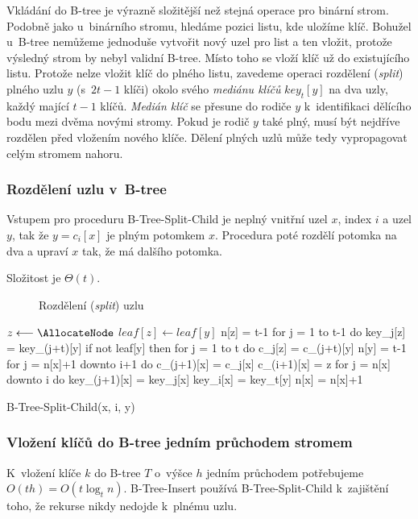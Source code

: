 Vkládání do B-tree je výrazně složitější než stejná operace pro binární
strom\@. Podobně jako u~binárního stromu, hledáme pozici listu,
kde uložíme klíč. Bohužel u~B-tree nemůžeme jednoduše vytvořit nový
uzel pro list a ten vložit, protože výsledný strom by nebyl validní
B-tree\@. Místo toho se vloží klíč už do existujícího listu\@. Protože
nelze vložit klíč do plného listu, zavedeme operaci rozdělení (\emph{split})
plného uzlu $y$ (s~$2t-1$ klíči) okolo svého \emph{mediánu klíčů}
$key_{t}[y]$ na dva uzly, každý mající $t-1$ klíčů\@. \emph{Medián
klíč} se přesune do rodiče $y$ k~identifikaci dělícího bodu mezi
dvěma novými stromy\@. Pokud je rodič $y$ také plný, musí být nejdříve
rozdělen před vložením nového klíče. Dělení plných uzlů může tedy
vypropagovat celým stromem nahoru.


\subsubsection{Rozdělení uzlu v~B-tree}

Vstupem pro proceduru B-Tree-Split-Child je neplný vnitřní uzel $x$,
index $i$ a uzel $y$, tak že $y=c_{i}[x]$ je plným potomkem $x$\@.
Procedura poté rozdělí potomka na dva a upraví $x$ tak, že má dalšího
potomka.

Složitost je $\Theta(t)$\@.

\begin{figure}[t]
\caption{Rozdělení (\emph{split}) uzlu}
\end{figure}


\begin{algorithm}[t]
\SetAlgoLined
{}
{$z \longleftarrow \AllocateNode$}
$leaf[z] \longleftarrow leaf[y]$
n[z] = t-1
for j = 1 to t-1
	do key_j[z] = key_(j+t)[y]
if not leaf[y]
	then for j = 1 to t
		do c_j[z] = c_(j+t)[y]
n[y] = t-1
for j = n[x]+1 downto i+1
	do c_(j+1)[x] = c_j[x]
c_(i+1)[x] = z
for j = n[x] downto i
	do key_(j+1)[x] = key_j[x]
key_i[x] = key_t[y]
n[x] = n[x]+1
\caption{B-Tree-Split-Child(x, i, y)}
\end{algorithm}



\subsubsection{Vložení klíčů do B-tree jedním průchodem stromem}

K~vložení klíče $k$ do B-tree $T$ o~výšce $h$ jedním průchodem
potřebujeme $O(th)=O(t\log_{t}n)$\@. B-Tree-Insert používá B-Tree-Split-Child
k~zajištění toho, že rekurse nikdy nedojde k~plnému uzlu\@.

